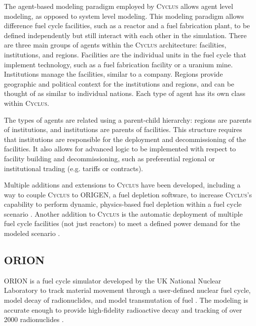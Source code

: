 \documentclass{article}
\newcommand{\Cyclus}{\textsc{Cyclus}\xspace}%
\begin{document}
    The agent-based modeling paradigm employed by \Cyclus allows agent level 
    modeling, as opposed to system level modeling. This modeling paradigm 
    allows difference 
    fuel cycle facilities, such as a reactor and a fuel fabrication plant, to 
    be defined independently but still interact with each other in the 
    simulation. There are three main groups of agents within the \Cyclus 
    architecture: facilities, institutions, and regions. Facilities are 
    the individual units in the fuel cycle that implement technology, 
    such as a fuel fabrication facility or a uranium mine. Institutions 
    manage the facilities, similar to a company. Regions provide geographic 
    and political context for the institutions and regions, and can be thought 
    of as similar to individual nations. Each type of agent has its own 
    class within \Cyclus. 

    The types of agents are related using a parent-child hierarchy: regions are
    parents of institutions, and institutions are parents of facilities. This 
    structure requires that institutions are responsible for the deployment 
    and decommissioning of the facilities. It also allows for advanced logic 
    to be implemented with respect to facility building and decommissioning, 
    such as preferential regional or institutional trading (e.g. tariffs or 
    contracts). 

    Multiple additions and extensions to \Cyclus have been developed, including 
    a way to couple \Cyclus to ORIGEN, a fuel depletion software, to increase
    \Cyclus's capability to perform dynamic, physics-based fuel depletion 
    within a fuel cycle scenario \cite{skutnik_cyborg:_2016}. Another 
    addition to \Cyclus is the automatic deployment of multiple fuel 
    cycle facilities (not just reactors) to meet a defined power demand 
    for the modeled scenario \cite{chee_demand-driven_2020}.    

\subsection{ORION}
    ORION is a fuel cycle simulator developed by the UK National Nuclear 
    Laboratory to track material movement through a user-defined nuclear 
    fuel cycle, model decay of radionuclides, and model transmutation of fuel
    \cite{gregg_analysis_2012}. The modeling is accurate enough to provide 
    high-fidelity radioactive decay and tracking of over 2000 radionuclides
    \cite{feng_standardized_2016}. 
    
\end{document}
